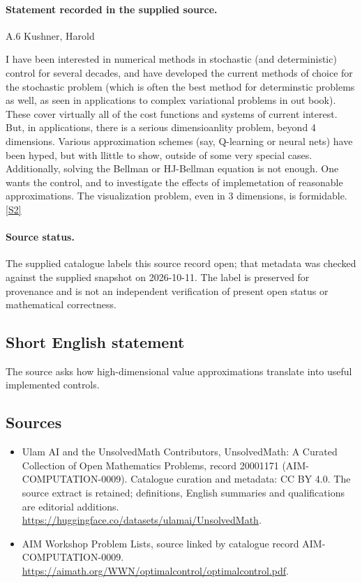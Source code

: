 \documentclass[11pt]{article}
\begin{document}
\paragraph{Statement recorded in the supplied source.}
A.6 Kushner, Harold

I have been interested in numerical methods in stochastic (and deterministic) control for several decades, and have developed the current methods of choice for the stochastic problem (which is often the best method for determinstic problems as well, as seen in applications to complex variational problems in out book). These cover virtually all of the cost functions and systems of current interest. But, in applications, there is a serious dimensioanlity problem, beyond 4 dimensions. Various approximation schemes (say, Q-learning or neural nets) have been hyped, but with llittle to show, outside of some very special cases. Additionally, solving the Bellman or HJ-Bellman equation is not enough. One wants the control, and to investigate the effects of implemetation of reasonable approximations. The visualization problem, even in 3 dimensions, is formidable. \href{https://aimath.org/WWN/optimalcontrol/optimalcontrol.pdf}{[S2]}
\paragraph{Source status.}
The supplied catalogue labels this source record open; that metadata was checked against the supplied snapshot on 2026-10-11. The label is preserved for provenance and is not an independent verification of present open status or mathematical correctness.
\subsection{Short English statement}
The source asks how high-dimensional value approximations translate into useful implemented controls.
\subsection{Sources}
\begin{itemize}
\item[S1] Ulam AI and the UnsolvedMath Contributors, UnsolvedMath: A Curated Collection of Open Mathematics Problems, record 20001171 (AIM-COMPUTATION-0009). Catalogue curation and metadata: CC BY 4.0. The source extract is retained; definitions, English summaries and qualifications are editorial additions.
\url{https://huggingface.co/datasets/ulamai/UnsolvedMath}.
\item[S2] AIM Workshop Problem Lists, source linked by catalogue record AIM-COMPUTATION-0009.
\url{https://aimath.org/WWN/optimalcontrol/optimalcontrol.pdf}.
\end{itemize}
\end{document}
